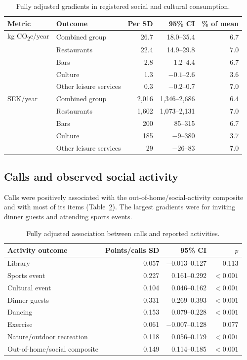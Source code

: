 \documentclass[11pt,a4paper]{article}
\begin{document}
\begin{table}[htbp]
	\centering
	\caption{Fully adjusted gradients in registered social and cultural consumption.}
	\label{tab:social-cultural}
	\begin{tabular}{@{}llrrr@{}}
		\toprule
		Metric & Outcome & Per SD & 95\% CI & \% of mean \\
		\midrule
		kg CO\textsubscript{2}e/year & Combined group & 26.7 & 18.0--35.4 & 6.7 \\
		 & Restaurants & 22.4 & 14.9--29.8 & 7.0 \\
		 & Bars & 2.8 & 1.2--4.4 & 6.7 \\
		 & Culture & 1.3 & $-0.1$--2.6 & 3.6 \\
		 & Other leisure services & 0.3 & $-0.2$--0.7 & 7.0 \\
		SEK/year & Combined group & 2,016 & 1,346--2,686 & 6.4 \\
		 & Restaurants & 1,602 & 1,073--2,131 & 7.0 \\
		 & Bars & 200 & 85--315 & 6.7 \\
		 & Culture & 185 & $-9$--380 & 3.7 \\
		 & Other leisure services & 29 & $-26$--83 & 7.0 \\
		\bottomrule
	\end{tabular}
\end{table}

\subsection{Calls and observed social activity}
Calls were positively associated with the out-of-home/social-activity
composite and with most of its items (Table~\ref{tab:calls-sociality}). The
largest gradients were for inviting dinner guests and attending sports events.

\begin{table}[htbp]
	\centering
	\caption{Fully adjusted association between calls and reported activities.}
	\label{tab:calls-sociality}
	\begin{tabular}{@{}lrrr@{}}
		\toprule
		Activity outcome & Points/calls SD & 95\% CI & $p$ \\
		\midrule
		Library & 0.057 & $-0.013$--0.127 & 0.113 \\
		Sports event & 0.227 & 0.161--0.292 & $<0.001$ \\
		Cultural event & 0.104 & 0.046--0.162 & $<0.001$ \\
		Dinner guests & 0.331 & 0.269--0.393 & $<0.001$ \\
		Dancing & 0.153 & 0.079--0.228 & $<0.001$ \\
		Exercise & 0.061 & $-0.007$--0.128 & 0.077 \\
		Nature/outdoor recreation & 0.118 & 0.056--0.179 & $<0.001$ \\
		Out-of-home/social composite & 0.149 & 0.114--0.185 & $<0.001$ \\
		\bottomrule
	\end{tabular}
\end{table}
\end{document}
